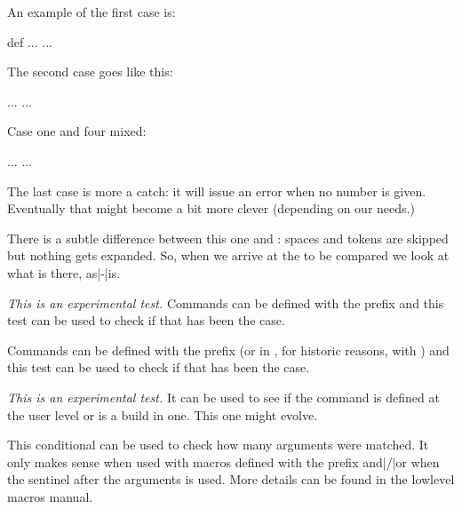 An example of the first case is:

\starttyping[option=TEX]
 {def}%
  ...
\else
  ...
\fi
\stoptyping

The second case goes like this:

\starttyping[option=TEX]
\iftok\scratchtoksone\scratchtokstwo
  ...
\else
  ...
\fi
\stoptyping

Case one and four mixed:

\starttyping[option=TEX]
\TempX
  ...
\else
  ...
\fi
\stoptyping

The last case is more a catch: it will issue an error when no number is given.
Eventually that might become a bit more clever (depending on our needs.)

\stopsectionlevel

\startsectionlevel[title={\tex{ifcstok}}]

There is a subtle difference between this one and : spaces
and \type {\relax} tokens are skipped but nothing gets expanded. So, when
we arrive at the to be compared  we look at what is there,
as|-|is.

\stopsectionlevel

\startsectionlevel[title={\tex{iffrozen}}]

{\em This is an experimental test.} Commands can be defined with the \type
{\frozen} prefix and this test can be used to check if that has been the case.

\stopsectionlevel

\startsectionlevel[title={\tex{ifprotected}}]

Commands can be defined with the \type {\protected} prefix (or in \CONTEXT, for
historic reasons, with \type {\unexpanded}) and this test can be used to check if
that has been the case.

\stopsectionlevel

\startsectionlevel[title={\tex{ifusercmd}}]

{\em This is an experimental test.} It can be used to see if the command is
defined at the user level or is a build in one. This one might evolve.

\stopsectionlevel

\startsectionlevel[title={\tex{ifarguments}}]

This conditional can be used to check how many arguments were matched. It only
makes sense when used with macros defined with the \type {\tolerant} prefix
and|/|or when the sentinel \type {\ignorearguments} after the arguments is used.
More details can be found in the lowlevel macros manual.

